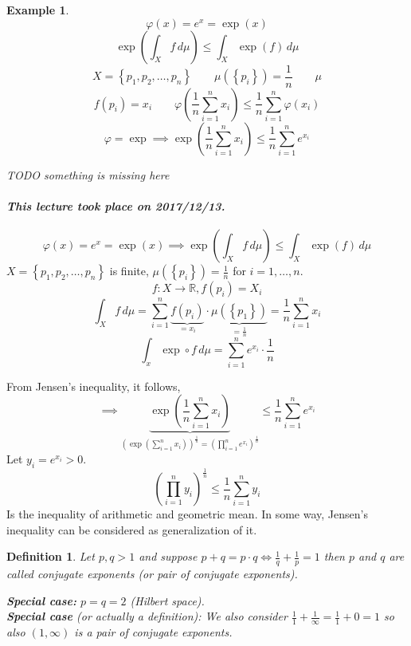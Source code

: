 \documentclass{article}
\newtheorem{example}{Example}  \numberwithin{example}{section}
\newtheorem{definition}{Definition}  \numberwithin{definition}{section}
\newcommand{\set}[1]{\left\{#1\right\}}
\newcommand{\dateref}[1]{\paragraph{\textit{This lecture took place on #1.}}}
\begin{document}
\begin{example}
  \[ \varphi(x) = e^x = \exp(x) \]
  \[ \exp(\int_X f \, d\mu) \leq \int_X \exp(f) \, d\mu \]
  \[ X = \set{p_1, p_2, \ldots, p_n} \qquad \mu(\set{p_i}) = \frac{1}{n} \qquad \mu \]
  \[ f(p_i) = x_i \qquad \varphi\left(\frac1n \sum_{i=1}^n x_i\right) \leq \frac{1}{n} \sum_{i=1}^{n} \varphi(x_i) \]
  \[ \varphi = \exp \implies \exp(\frac{1}{n} \sum_{i=1}^n x_i) \leq \frac1n \sum_{i=1}^n e^{x_i} \]

  TODO something is missing here
\end{example}

\dateref{2017/12/13}

\[ \varphi(x) = e^x = \exp(x) \implies \exp\left(\int_X f \, d\mu\right) \leq \int_X \exp(f) \, d\mu \]
$X = \set{p_1, p_2, \ldots, p_n}$ is finite, $\mu(\set{p_i}) = \frac1n$ for $i=1,\ldots,n$.
\[ f: X \to \mathbb R, f(p_i) = X_i \]
\[ \int_X f \, d\mu = \sum_{i=1}^n \underbrace{f(p_i)}_{= x_i} \cdot \underbrace{\mu(\set{p_1})}_{= \frac1n} = \frac1n \sum_{i=1}^n x_i \]
\[ \int_x \exp \circ f \, d\mu = \sum_{i=1}^n e^{x_i} \cdot \frac1n \]

From Jensen's inequality, it follows,
\[ \implies \underbrace{\exp\left(\frac1n \sum_{i=1}^n x_i\right)}_{\left(\exp(\sum_{i=1}^n x_i)\right)^{\frac1n} = \left(\prod_{i=1}^n e^{x_i}\right)^{\frac1n}} \leq \frac1n \sum_{i=1}^n e^{x_i} \]
Let $y_i = e^{x_i} > 0$.
\[ \left(\prod_{i=1}^n y_i\right)^{\frac1n} \leq \frac1n \sum_{i=1}^n y_i \]
Is the inequality of arithmetic and geometric mean.
In some way, Jensen's inequality can be considered as generalization of it.

\begin{definition}
  Let $p,q > 1$ and suppose $p+q = p\cdot q \iff \frac1q + \frac1p = 1$ then $p$ and $q$ are called \emph{conjugate exponents} (or \emph{pair of conjugate exponents}).
  
  \textbf{Special case:} $p=q=2$ (Hilbert space). \\
  \textbf{Special case} (or actually a definition): We also consider $\frac11 + \frac1\infty = \frac11 + 0 = 1$ so also $(1,\infty)$ is a pair of conjugate exponents.
\end{definition}
\end{document}
